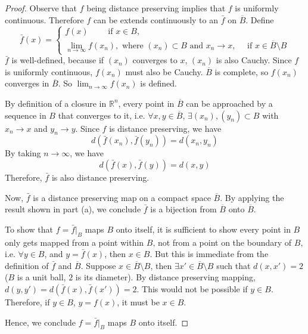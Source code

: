 \documentclass[11pt,a4paper]{amsart}
\def\R{{\mathbb R}}
\begin{document}

\begin{proof}
Observe that $f$ being distance preserving implies that $f$ is uniformly continuous. 
Therefore $f$ can be extends continuously to an $\bar f$ on $\overline{B}$. Define 
\[
\bar f(x) = \begin{cases}
f(x) \qquad\textrm{ if } x \in B,\\
\lim_{n\to\infty} f(x_n), {\scriptstyle \textrm{ where } (x_n) \subset B\textrm{ and } x_n \to x}, \quad\textrm{ if } x \in \overline{B}\setminus B
\end{cases}
\]
$\bar f$ is well-defined, because if $(x_n)$ converges to $x$, $(x_n)$ is also Cauchy. 
Since $f$ is uniformly continuous, $f(x_n)$ must also be Cauchy. 
$\overline{B}$ is complete, so $f(x_n)$ converges in $\overline{B}$. 
So $\lim_{n\to\infty} f(x_n)$ is defined.

By definition of a closure in $\R^n$, every point in $\overline{B}$ can be approached 
by a sequence in $B$ that converges to it, i.e.
$\forall x,y \in\overline{B}$, $\exists (x_n), (y_n)\subset B$ with 
$x_n \to x$ and $y_n \to y$. 
Since $f$ is distance preserving, we have
$$ d(\bar f(x_n), \bar f(y_n)) = d(x_n, y_n) $$
By taking $n\to\infty$, we have 
$$ d(\bar f(x), \bar f(y)) = d(x,y) $$
Therefore, $\bar f$ is also distance preserving.

Now, $\bar f$ is a distance preserving map on a compact space $\overline{B}$. 
By applying the result shown in part (a), we conclude $\bar f$ is a bijection 
from $\overline{B}$ onto $\overline{B}$. 

To show that $f=\bar f|_B$ maps $B$ onto itself, it is sufficient to show 
every point in $B$ only gets mapped from a point within $B$, not from a point on
the boundary of $B$, i.e. $\forall y \in B$, and $y = \bar f(x)$, then $x\in B$. But this is immediate from the definition of $\bar f$ and $\overline{B}$.
Suppose $x\in \overline{B}\setminus B$, then $\exists x' \in \overline{B}\setminus B$ such that $d(x,x') = 2$ ($B$ is a unit ball, $2$ is its diameter).
By distance preserving mapping, $d(y,y')=d(\bar f(x), \bar f(x'))=2$. 
This would not be possible if $y \in B$.
Therefore, if $y \in B$, $y=f(x)$, it must be $x\in B$.

Hence, we conclude $f=\bar f|_B$ maps $B$ onto itself.
\end{proof}
\end{document}
